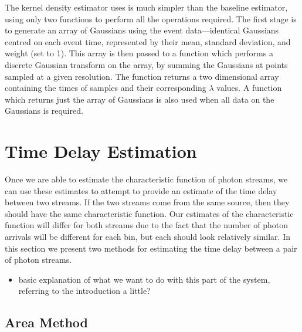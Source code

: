 \documentclass[a4paper,11pt]{article}
\begin{document}
   The kernel density estimator uses is much simpler than the baseline
   estimator, using only two functions to perform all the operations
   required. The first stage is to generate an array of Gaussians using the
   event data---identical Gaussians centred on each event time, represented by
   their mean, standard deviation, and weight (set to 1). This array is then
   passed to a function which performs a discrete Gaussian transform on the
   array, by summing the Gaussians at points sampled at a given resolution. The
   function returns a two dimensional array containing the times of samples and
   their corresponding $\lambda$ values. A function which returns just the array
   of Gaussians is also used when all data on the Gaussians is required.
\section{Time Delay Estimation}
\label{sec-7}

Once we are able to estimate the characteristic function of photon streams, we
can use these estimates to attempt to provide an estimate of the time delay
between two streams. If the two streams come from the same source, then they
should have the same characteristic function. Our estimates of the
characteristic function will differ for both streams due to the fact that the
number of photon arrivals will be different for each bin, but each should look
relatively similar. In this section we present two methods for estimating the
time delay between a pair of photon streams.
\begin{itemize}
\item basic explanation of what we want to do with this part of the system,
  referring to the introduction a little?
\end{itemize}
\subsection{Area Method}
\label{sec-7-1}
\end{document}
